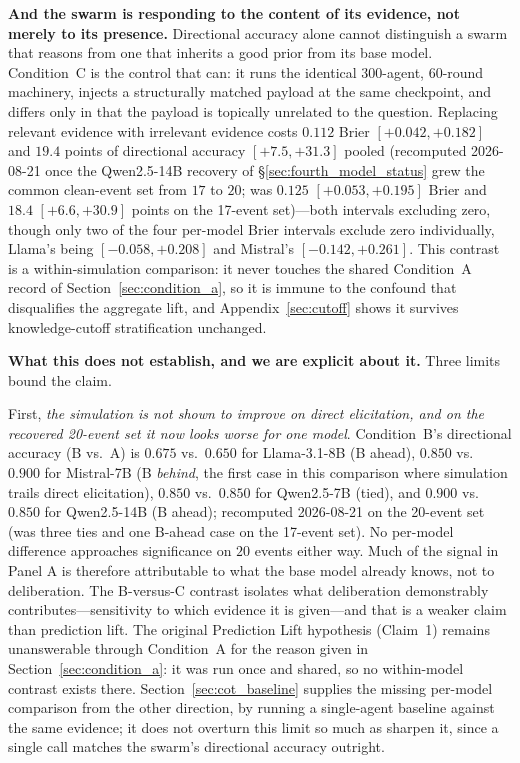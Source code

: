 \documentclass[11pt,journal,onecolumn]{IEEEtran}
\begin{document}
\textbf{And the swarm is responding to the content of its evidence, not merely to its presence.} Directional accuracy alone cannot distinguish a swarm that reasons from one that inherits a good prior from its base model. Condition~C is the control that can: it runs the identical $300$-agent, $60$-round machinery, injects a structurally matched payload at the same checkpoint, and differs only in that the payload is topically unrelated to the question. Replacing relevant evidence with irrelevant evidence costs $0.112$ Brier $[+0.042, +0.182]$ and $19.4$ points of directional accuracy $[+7.5, +31.3]$ pooled (recomputed 2026-08-21 once the Qwen2.5-14B recovery of \S\ref{sec:fourth_model_status} grew the common clean-event set from $17$ to $20$; was $0.125$ $[+0.053,+0.195]$ Brier and $18.4$ $[+6.6,+30.9]$ points on the 17-event set)---both intervals excluding zero, though only two of the four per-model Brier intervals exclude zero individually, Llama's being $[-0.058,+0.208]$ and Mistral's $[-0.142,+0.261]$. This contrast is a within-simulation comparison: it never touches the shared Condition~A record of Section~\ref{sec:condition_a}, so it is immune to the confound that disqualifies the aggregate lift, and Appendix~\ref{sec:cutoff} shows it survives knowledge-cutoff stratification unchanged.

\textbf{What this does not establish, and we are explicit about it.} Three limits bound the claim.

First, \emph{the simulation is not shown to improve on direct elicitation, and on the recovered 20-event set it now looks worse for one model}. Condition~B's directional accuracy (B vs.\ A) is $0.675$ vs.\ $0.650$ for Llama-3.1-8B (B ahead), $0.850$ vs.\ $0.900$ for Mistral-7B (B \emph{behind}, the first case in this comparison where simulation trails direct elicitation), $0.850$ vs.\ $0.850$ for Qwen2.5-7B (tied), and $0.900$ vs.\ $0.850$ for Qwen2.5-14B (B ahead); recomputed 2026-08-21 on the 20-event set (was three ties and one B-ahead case on the 17-event set). No per-model difference approaches significance on $20$ events either way. Much of the signal in Panel A is therefore attributable to what the base model already knows, not to deliberation. The B-versus-C contrast isolates what deliberation demonstrably contributes---sensitivity to which evidence it is given---and that is a weaker claim than prediction lift. The original Prediction Lift hypothesis (Claim~1) remains unanswerable through Condition~A for the reason given in Section~\ref{sec:condition_a}: it was run once and shared, so no within-model contrast exists there. Section~\ref{sec:cot_baseline} supplies the missing per-model comparison from the other direction, by running a single-agent baseline against the same evidence; it does not overturn this limit so much as sharpen it, since a single call matches the swarm's directional accuracy outright.
\end{document}
